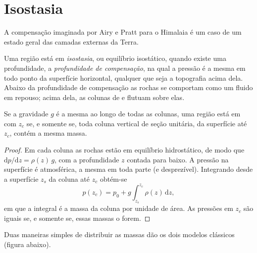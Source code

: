 \section{Isostasia}

A compensação imaginada por Airy e Pratt para o Himalaia é um caso de um
estado geral das camadas externas da Terra.

\begin{definition}\label{def:b1:isostasy-gravity:isostasy}
Uma região está em \emph{isostasia}, ou equilíbrio isostático, quando
existe uma profundidade, a \emph{profundidade de compensação},
na qual a pressão é a mesma em todo ponto da superfície horizontal, qualquer que seja a topografia
acima dela. Abaixo da profundidade de compensação as rochas se comportam como um fluido em repouso;
acima dela, as colunas de  e  flutuam sobre elas.
\end{definition}

\begin{proposition}\label{prop:b1:isostasy-gravity:equal-mass}
Se a gravidade $g$ é a mesma ao longo de todas as colunas, uma região está em  com
 $z_c$ se, e somente se, toda coluna vertical de seção unitária,
da superfície até $z_c$, contém a mesma massa.
\end{proposition}

\begin{proof}
Em cada coluna as rochas estão em equilíbrio hidrostático, de modo que
$\mathrm dp/\mathrm dz = \rho(z)\,g$, com a profundidade $z$ contada para baixo. A
pressão na superfície é atmosférica, a mesma em toda parte (e desprezível).
Integrando desde a superfície $z_s$ da coluna até $z_c$ obtém-se
\[
  p(z_c) = p_0 + g\int_{z_s}^{z_c}\rho(z)\,\mathrm dz ,
\]
em que a integral é a massa da coluna por unidade de área. As pressões em
$z_c$ são iguais se, e somente se, essas massas o forem.
\end{proof}

Duas maneiras simples de distribuir as massas dão os dois modelos clássicos
(figura abaixo).

